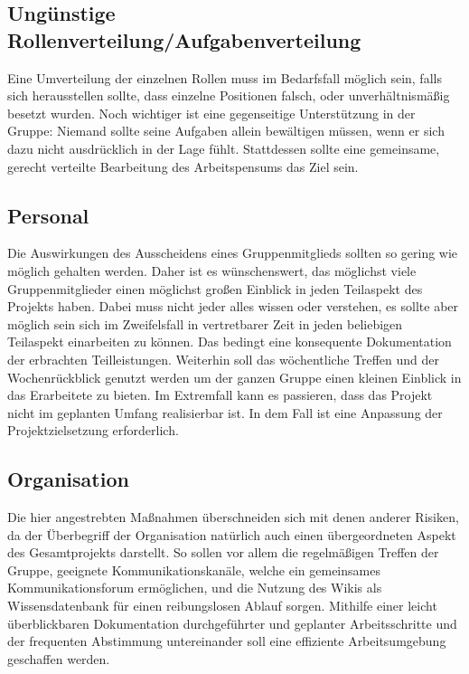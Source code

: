 
\subsection{Ungünstige Rollenverteilung/Aufgabenverteilung}\label{m5}
  Eine Umverteilung der einzelnen Rollen muss im Bedarfsfall möglich sein, falls sich herausstellen sollte, dass einzelne Positionen falsch, oder unverhältnismäßig besetzt wurden. Noch wichtiger ist eine gegenseitige Unterstützung in der Gruppe: Niemand sollte seine Aufgaben allein bewältigen müssen, wenn er sich dazu nicht ausdrücklich in der Lage fühlt. Stattdessen sollte eine gemeinsame, gerecht verteilte Bearbeitung des Arbeitspensums das Ziel sein.

\Hack{\enlargethispage{1.0\baselineskip}}
\subsection{Personal}\label{m4}
  Die Auswirkungen des Ausscheidens eines Gruppenmitglieds sollten so gering wie möglich gehalten werden.
  Daher ist es wünschenswert, das möglichst viele Gruppenmitglieder einen möglichst großen Einblick in jeden Teilaspekt des Projekts haben. Dabei muss nicht jeder alles wissen oder verstehen, es sollte aber möglich sein sich im Zweifelsfall in vertretbarer Zeit in jeden beliebigen Teilaspekt einarbeiten zu können.
  Das bedingt eine konsequente Dokumentation der erbrachten Teilleistungen.
  Weiterhin soll das wöchentliche Treffen und der Wochenrückblick genutzt werden um der ganzen Gruppe einen kleinen Einblick in das Erarbeitete zu bieten.
  Im Extremfall kann es passieren, dass das Projekt nicht im geplanten Umfang realisierbar ist. In dem Fall ist eine Anpassung der Projektzielsetzung erforderlich.




\subsection{Organisation}\label{m6}
\bgroup
{}
  Die hier angestrebten Maßnahmen überschneiden sich mit denen anderer Risiken, da der Überbegriff der Organisation natürlich auch einen übergeordneten Aspekt des Gesamtprojekts darstellt. So sollen vor allem die regelmäßigen Treffen der Gruppe, geeignete Kom\-mu\-ni\-ka\-tions\-ka\-nä\-le, welche ein gemeinsames Kommunikationsforum ermöglichen, und die Nutzung des Wikis als Wissensdatenbank für einen reibungslosen Ablauf sorgen. Mithilfe einer leicht überblickbaren Dokumentation durchgeführter und geplanter Arbeitsschritte und der frequenten Abstimmung untereinander soll eine effiziente Arbeitsumgebung geschaffen werden.
\egroup

